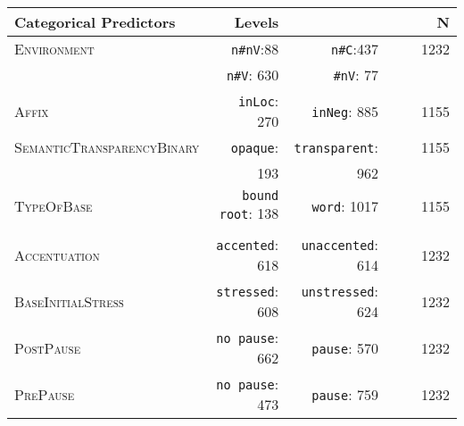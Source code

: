 \begin{table}
{\begin{tabular}{lrrrrr}
				\midrule
				\textbf{Categorical Predictors }& Levels &   &  & &N  \\ 
				\midrule
				\textsc{Environment}       & \texttt{n\#nV}:88  &   \texttt{n\#C}:437   & && 1232\\ 
				& \texttt{n\#V}: 630  & \texttt{\#nV}: 77  &&& \\ 		
				\textsc{Affix}        &\texttt{inLoc}: 270 & \texttt{inNeg}: 885 & &&1155 \\ 	
				\textsc{SemanticTransparencyBinary}        & \texttt{opaque}: & \texttt{transparent}: && & 1155\\ 
				& 193& 962&& & \\ 
				\textsc{TypeOfBase}        &\texttt{ bound root}: 138& \texttt{ word}: 1017& &&  1155\\ 	
				&& & && \\ 			
				\textsc{Accentuation}       &\texttt{accented}: 618 & \texttt{unaccented}: 614 & && 1232 \\ 
				\textsc{BaseInitialStress}       &\texttt{stressed}: 608 & \texttt{unstressed}: 624 & & & 1232\\ 		
				\textsc{PostPause}       &\texttt{no pause}: 662 & \texttt{pause}: 570 & && 1232 \\ 
				\textsc{PrePause}       &\texttt{no pause}: 473 & \texttt{pause}: 759 & & & 1232\\ 
				\midrule
			\end{tabular}
		}
	

\end{table}



